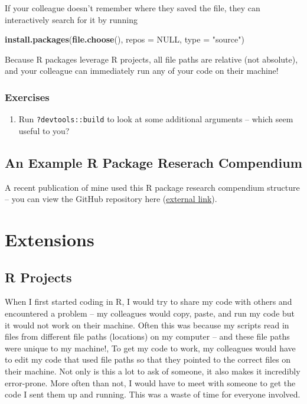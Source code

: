 \documentclass[
]{book}
\newenvironment{Shaded}{\begin{snugshade}}{\end{snugshade}}
\newcommand{\DataTypeTok}[1]{\textcolor[rgb]{0.13,0.29,0.53}{#1}}
\newcommand{\KeywordTok}[1]{\textcolor[rgb]{0.13,0.29,0.53}{\textbf{#1}}}
\newcommand{\NormalTok}[1]{#1}
\newcommand{\OtherTok}[1]{\textcolor[rgb]{0.56,0.35,0.01}{#1}}
\newcommand{\StringTok}[1]{\textcolor[rgb]{0.31,0.60,0.02}{#1}}
\providecommand{\tightlist}{%
  \setlength{\itemsep}{0pt}\setlength{\parskip}{0pt}}
\begin{document}
If your colleague doesn't remember where they saved the file, they can interactively search for it by running

\begin{Shaded}
\begin{Highlighting}[]
\KeywordTok{install.packages}\NormalTok{(}\KeywordTok{file.choose}\NormalTok{(), }\DataTypeTok{repos =} \OtherTok{NULL}\NormalTok{, }\DataTypeTok{type =} \StringTok{"source"}\NormalTok{)}
\end{Highlighting}
\end{Shaded}

Because R packages leverage R projects, all file paths are relative (not absolute), and your colleague can immediately run any of your code on their machine!

\hypertarget{ex-set10}{%
\subsection{Exercises}\label{ex-set10}}

\begin{enumerate}
\def\labelenumi{\arabic{enumi}.}
\tightlist
\item
  Run \texttt{?devtools::build} to look at some additional arguments -- which seem useful to you?
\end{enumerate}

\hypertarget{ex-rc}{%
\section{An Example R Package Reserach Compendium}\label{ex-rc}}

A recent publication of mine used this R package research compendium structure -- you can view the GitHub repository here (\href{https://github.com/michaeldumelle/DumelleEtAl2021STLMM}{external link}).

\hypertarget{extensions}{%
\chapter{Extensions}\label{extensions}}

\hypertarget{r-projects}{%
\section{R Projects}\label{r-projects}}

When I first started coding in R, I would try to share my code with others and encountered a problem -- my colleagues would copy, paste, and run my code but it would not work on their machine. Often this was because my scripts read in files from different file paths (locations) on my computer -- and these file paths were unique to my machine!, To get my code to work, my colleagues would have to edit my code that used file paths so that they pointed to the correct files on their machine. Not only is this a lot to ask of someone, it also makes it incredibly error-prone. More often than not, I would have to meet with someone to get the code I sent them up and running. This was a waste of time for everyone involved.
\end{document}
